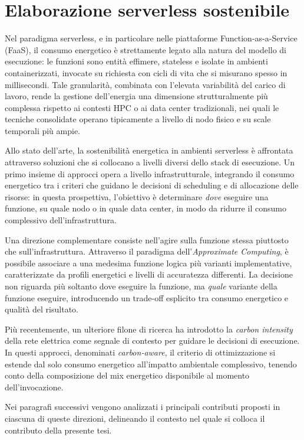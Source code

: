 \section{Elaborazione serverless sostenibile}

Nel paradigma serverless, e in particolare nelle piattaforme
Function-as-a-Service (FaaS), il consumo energetico è strettamente
legato alla natura del modello di esecuzione: le funzioni sono entità
effimere, stateless e isolate in ambienti containerizzati, invocate su
richiesta con cicli di vita che si misurano spesso in millisecondi.
Tale granularità, combinata con l'elevata variabilità del carico di
lavoro, rende la gestione dell'energia una dimensione strutturalmente
più complessa rispetto ai contesti HPC o ai data center tradizionali,
nei quali le tecniche consolidate operano tipicamente a livello di nodo
fisico e su scale temporali più ampie.

Allo stato dell'arte, la sostenibilità energetica in ambienti serverless
è affrontata attraverso soluzioni che si collocano a livelli diversi
dello stack di esecuzione. Un primo insieme di approcci opera a livello
infrastrutturale, integrando il consumo energetico tra i criteri che
guidano le decisioni di scheduling e di allocazione delle risorse: in
questa prospettiva, l'obiettivo è determinare \emph{dove} eseguire una
funzione, su quale nodo o in quale data center, in modo da ridurre il
consumo complessivo dell'infrastruttura.

Una direzione complementare consiste nell'agire sulla funzione stessa
piuttosto che sull'infrastruttura. Attraverso il paradigma
dell'\emph{Approximate Computing}, è possibile associare a una medesima
funzione logica più varianti implementative, caratterizzate da profili
energetici e livelli di accuratezza differenti. La decisione non riguarda
più soltanto dove eseguire la funzione, ma \emph{quale} variante della
funzione eseguire, introducendo un trade-off esplicito tra consumo
energetico e qualità del risultato.

Più recentemente, un ulteriore filone di ricerca ha introdotto la
\emph{carbon intensity} della rete elettrica come segnale di contesto
per guidare le decisioni di esecuzione. In questi approcci, denominati
\emph{carbon-aware}, il criterio di ottimizzazione si estende dal solo
consumo energetico all'impatto ambientale complessivo, tenendo conto
della composizione del mix energetico disponibile al momento
dell'invocazione.

Nei paragrafi successivi vengono analizzati i principali contributi
proposti in ciascuna di queste direzioni, delineando il contesto nel
quale si colloca il contributo della presente tesi.



